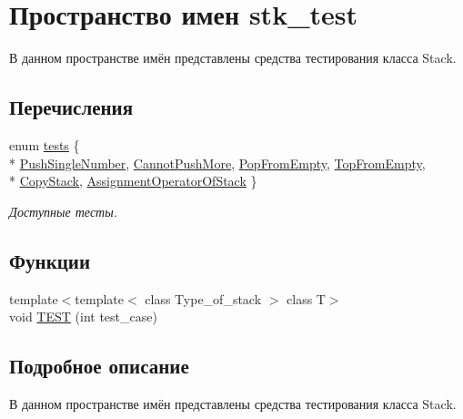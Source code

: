 \hypertarget{namespacestk__test}{}\section{Пространство имен stk\+\_\+test}
\label{namespacestk__test}


В данном пространстве имён представлены средства тестирования класса Stack.  


\subsection*{Перечисления}
\begin{DoxyCompactItemize}
\item 
enum \hyperlink{namespacestk__test_aee7ec7a767abf7b0b65ce9a2afb7de78}{tests} \{ \\*
\hyperlink{namespacestk__test_aee7ec7a767abf7b0b65ce9a2afb7de78a16992c4d9ecd605ea8503740aee9df96}{Push\+Single\+Number}, 
\hyperlink{namespacestk__test_aee7ec7a767abf7b0b65ce9a2afb7de78a6e2bd84a1d3046f2c01c930a1d52be64}{Cannot\+Push\+More}, 
\hyperlink{namespacestk__test_aee7ec7a767abf7b0b65ce9a2afb7de78ae9c603d2f7d582fd4fdd5db8140ceecf}{Pop\+From\+Empty}, 
\hyperlink{namespacestk__test_aee7ec7a767abf7b0b65ce9a2afb7de78acd574f7057fc049aa4da1da5f4b7fd3a}{Top\+From\+Empty}, 
\\*
\hyperlink{namespacestk__test_aee7ec7a767abf7b0b65ce9a2afb7de78aef89859ac32f020e99414e3d3e559713}{Copy\+Stack}, 
\hyperlink{namespacestk__test_aee7ec7a767abf7b0b65ce9a2afb7de78adc3b2cd62978794a43af9212cd2c6be7}{Assignment\+Operator\+Of\+Stack}
 \}
\begin{DoxyCompactList}\small\item\em Доступные тесты. \end{DoxyCompactList}\end{DoxyCompactItemize}
\subsection*{Функции}
\begin{DoxyCompactItemize}
\item 
{\footnotesize template$<$template$<$ class Type\+\_\+of\+\_\+stack $>$ class T$>$ }\\void \hyperlink{namespacestk__test_a6e5c68f4363af9e5204334b3c875d641}{T\+E\+S\+T} (int test\+\_\+case)
\end{DoxyCompactItemize}


\subsection{Подробное описание}
В данном пространстве имён представлены средства тестирования класса Stack. 

